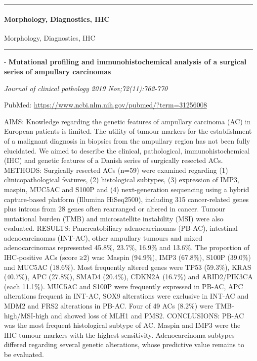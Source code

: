 \documentclass[
]{article}
\renewcommand{\linethickness}{0.05em}
\begin{document}
\begin{center}\rule{0.5\linewidth}{\linethickness}\end{center}

\hypertarget{morphology-diagnostics-ihc-2}{%
\paragraph{Morphology, Diagnostics,
IHC}\label{morphology-diagnostics-ihc-2}}

Morphology, Diagnostics, IHC

\begin{center}\rule{0.5\linewidth}{\linethickness}\end{center}

- \textbf{Mutational profiling and immunohistochemical analysis of a
surgical series of ampullary carcinomas}

\emph{Journal of clinical pathology 2019 Nov;72(11):762-770}

PubMed: \url{https://www.ncbi.nlm.nih.gov/pubmed/?term=31256008}

AIMS: Knowledge regarding the genetic features of ampullary carcinoma
(AC) in European patients is limited. The utility of tumour markers for
the establishment of a malignant diagnosis in biopsies from the
ampullary region has not been fully elucidated. We aimed to describe the
clinical, pathological, immunohistochemical (IHC) and genetic features
of a Danish series of surgically resected ACs. METHODS: Surgically
resected ACs (n=59) were examined regarding (1) clinicopathological
features, (2) histological subtypes, (3) expression of IMP3, maspin,
MUC5AC and S100P and (4) next-generation sequencing using a hybrid
capture-based platform (Illumina HiSeq2500), including 315
cancer-related genes plus introns from 28 genes often rearranged or
altered in cancer. Tumour mutational burden (TMB) and microsatellite
instability (MSI) were also evaluated. RESULTS: Pancreatobiliary
adenocarcinomas (PB-AC), intestinal adenocarcinomas (INT-AC), other
ampullary tumours and mixed adenocarcinomas represented 45.8\%, 23.7\%,
16.9\% and 13.6\%. The proportion of IHC-positive ACs (score ≥2) was:
Maspin (94.9\%), IMP3 (67.8\%), S100P (39.0\%) and MUC5AC (18.6\%). Most
frequently altered genes were TP53 (59.3\%), KRAS (40.7\%), APC
(27.8\%), SMAD4 (20.4\%), CDKN2A (16.7\%) and ARID2/PIK3CA (each
11.1\%). MUC5AC and S100P were frequently expressed in PB-AC, APC
alterations frequent in INT-AC, SOX9 alterations were exclusive in
INT-AC and MDM2 and FRS2 alterations in PB-AC. Four of 49 ACs (8.2\%)
were TMB-high/MSI-high and showed loss of MLH1 and PMS2. CONCLUSIONS:
PB-AC was the most frequent histological subtype of AC. Maspin and IMP3
were the IHC tumour markers with the highest sensitivity. Adenocarcinoma
subtypes differed regarding several genetic alterations, whose
predictive value remains to be evaluated.
\end{document}
